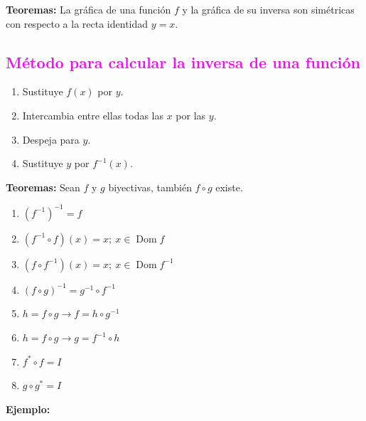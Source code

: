 \documentclass[11pt,a4paper]{article}
\begin{document}
\textcolor{rojo}{\textbf{Teoremas:}} La gráfica de una función $f$ y la gráfica de su inversa
son simétricas con respecto a la recta identidad $y = x$.

\subsection*{\textcolor{magenta}{Método para calcular la inversa de una función}}
\begin{enumerate}
  \item Sustituye $f(x)$ por $y$.
  \item Intercambia entre ellas todas las $x$ por las $y$.
  \item Despeja para $y$.
  \item Sustituye $y$ por $f^{-1}(x)$.
\end{enumerate}

\textcolor{naranja}{\textbf{Teoremas:}} Sean $f$ y $g$ biyectivas, también $f\circ g$ existe.

\begin{minipage}[t]{0.533\textwidth}
\begin{enumerate}
  \item $(f^{-1})^{-1} = f$
  \item $(f^{-1}\circ f)(x) = x;\ x \in \operatorname{Dom}f$
  \item $(f\circ f^{-1})(x) = x;\ x \in \operatorname{Dom}f^{-1}$
  \item $(f\circ g)^{-1} = g^{-1}\circ f^{-1}$
  \item $h = f\circ g \rightarrow f = h\circ g^{-1}$
  \item $h = f\circ g \rightarrow g = f^{-1}\circ h$
\end{enumerate}
\end{minipage}\hfill
\begin{minipage}[t]{0.436\textwidth}
\begin{enumerate}\setcounter{enumi}{6}
  \item $f^*\circ f = I$
  \item $g\circ g^* = I$
\end{enumerate}
\end{minipage}

\medskip
\textbf{Ejemplo:}
\end{document}
